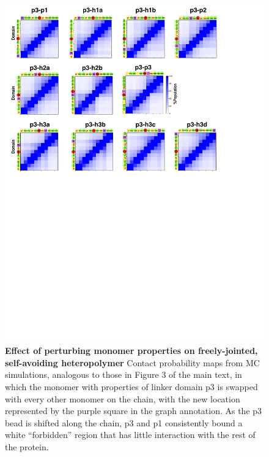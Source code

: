 \documentclass[10pt,letterpaper]{article}
\begin{document}
 \begin{figure}[!ht]
\includegraphics[scale=0.5,width=\textwidth,trim={0 0cm 0 0cm},clip]{../figures/S4.pdf}
\caption{{\bf Effect of perturbing monomer properties on freely-jointed, self-avoiding heteropolymer} Contact probability maps from MC simulations, analogous to those in Figure 3 of the main text, in which the monomer with properties of linker domain p3 is swapped with every other monomer on the chain, with the new location represented by the purple square in the graph annotation.  As the p3 bead is shifted along the chain, p3 and p1 consistently bound a white ``forbidden'' region that has little interaction with the rest of the protein. }
\label{S4} 
\end{figure}
\end{document}
